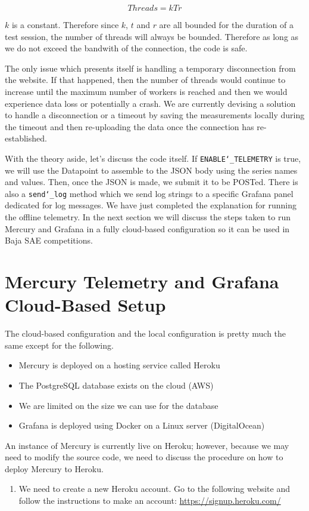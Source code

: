 \documentclass[12pt, letterpaper]{article}
\begin{document}
{{{{{{{{{{{{\begin{equation}
	Threads = kTr
\end{equation}

\par $k$ is a constant. Therefore since $k$, $t$ and $r$ are all bounded for the duration of a test session, the number of threads will always be bounded. Therefore as long as we do not exceed the bandwith of the connection, the code is safe. 

\par The only issue which presents itself is handling a temporary disconnection from the website. If that happened, then the number of threads would continue to increase until the maximum number of workers is reached and then we would experience data loss or potentially a crash. We are currently devising a solution to handle a disconnection or a timeout by saving the measurements locally during the timeout and then re-uploading the data once the connection has re-established. 
	\par With the theory aside, let's discuss the code itself. If \texttt{ENABLE\char`_TELEMETRY} is true, we will use the Datapoint to assemble to the JSON body using the series names and values. Then, once the JSON is made, we submit it to be POSTed. There is also a \texttt{send\char`_log} method which we send log strings to a specific Grafana panel dedicated for log messages.
	We have just completed the explanation for running the offline telemetry. In the next section we will discuss the steps taken to run Mercury and Grafana in a fully cloud-based configuration so it can be used in Baja SAE competitions. 
	
\section {Mercury Telemetry and Grafana Cloud-Based Setup}
	\par The cloud-based configuration and the local configuration is pretty much the same except for the following.
\begin{itemize}
	\item Mercury is deployed on a hosting service called Heroku
	\item The PostgreSQL database exists on the cloud (AWS)
	\item We are limited on the size we can use for the database
	\item Grafana is deployed using Docker on a Linux server (DigitalOcean)
\end{itemize}
	\par An instance of Mercury is currently live on Heroku; however, because we may need to modify the source code, we need to discuss the procedure on how to deploy Mercury to Heroku.
	\begin{enumerate}
		\item We need to create a new Heroku account. Go to the following website and follow the instructions to make an account: \url{https://signup.heroku.com/}
		

\end{enumerate}}}}}}}}}}}}}
\end{document}
